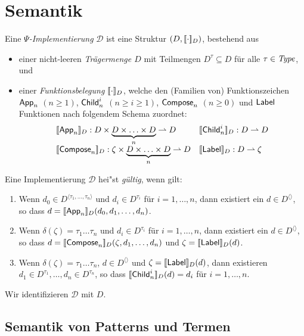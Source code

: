 \documentclass[12pt,a4paper,draft]{article}
\begin{document}
\section*{Semantik}

Eine \emph{$\Psi$-Implementierung} $\mathcal{D}$ ist eine Struktur $(D,[\![\cdot]\!]_D)$, bestehend aus
\begin{itemize}
\item einer nicht-leeren \emph{Tr\"agermenge $D$} mit Teilmengen $D^\tau \subseteq D$ f\"ur alle $\tau \in \mathit{Type}$, und
\item einer \emph{Funktionsbelegung $[\![\cdot]\!]_D$}, welche den (Familien von) Funktionszeichen
  $\mathsf{App}_n$ $(n \ge 1)$, $\mathsf{Child}_n^i$ $(n \ge i \ge 1)$, $\mathsf{Compose}_n$ $(n \ge 0)$ und $\mathsf{Label}$ Funktionen
  nach folgendem Schema zuordnet:
  \[\begin{array}{ll}
    \sem{\App_n}_D: D \times \underbrace{D \times \ldots \times D}_n \pto D &
    \sem{\Child_n^i}_D: D \pto D \\
    \sem{\Compose_n}_D: \zeta \times \underbrace{D \times \ldots \times D}_n \pto D &
    \sem{\Label}_D: D \pto \zeta \\
  \end{array}\]
\end{itemize}
Eine Implementierung $\mathcal{D}$ hei"st \emph{g\"ultig}, wenn gilt:
\begin{enumerate}
\item Wenn $d_0 \in D^{\langle \tau_1,\ldots,\tau_n \rangle}$ und $d_i \in D^{\tau_i}$ f\"ur $i=1,\ldots,n$,
  dann existiert ein $d \in D^{\langle \rangle}$, so dass $d = [\![\mathsf{App}_n]\!]_D(d_0,d_1,\ldots,d_n)$.
\item Wenn $\delta(\zeta) = \tau_1\ldots\tau_n$ und $d_i \in D^{\tau_i}$ f\"ur $i=1,\ldots,n$,
  dann existiert ein $d \in D^{\langle \rangle}$, so dass $d = [\![\mathsf{Compose}_n]\!]_D(\zeta,d_1,\ldots,d_n)$
  und $\zeta = [\![\mathsf{Label}]\!]_D(d)$.
\item Wenn $\delta(\zeta) = \tau_1\ldots\tau_n$, $d \in D^{\langle \rangle}$ und $\zeta = [\![\mathsf{Label}]\!]_D(d)$, dann
  existieren $d_1 \in D^{\tau_1},\ldots,d_n \in D^{\tau_n}$, so dass $[\![\mathsf{Child}_n^i]\!]_D(d) = d_i$ f\"ur $i=1,\ldots,n$.
\end{enumerate}
Wir identifizieren $\mathcal{D}$ mit $D$.

\subsection*{Semantik von Patterns und Termen}
\end{document}
